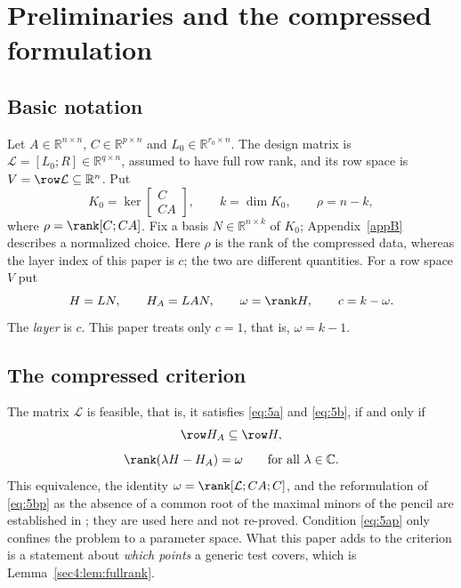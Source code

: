 \section{Preliminaries and the compressed formulation}
\label{sec:prelim}

\subsection{Basic notation}
\label{sec:prelim:notation}

Let $A\in\mathbb R^{n\times n}$, $C\in\mathbb R^{p\times n}$ and $L_0\in\mathbb R^{r_0\times n}$. The
design matrix is $\mathcal L=[L_0;R]\in\mathbb R^{q\times n}$, assumed to have full row rank, and its
row space is $V=\row\mathcal L\subseteq\mathbb R^n$. Put
\begin{equation}
  \label{eq:K0}
  K_0=\ker\left[\begin{smallmatrix}C\\ CA\end{smallmatrix}\right],\qquad
  k=\dim K_0,\qquad
  \rho=n-k,
\end{equation}
where $\rho=\rank[C;CA]$. Fix a basis $N\in\mathbb R^{n\times k}$ of $K_0$; Appendix~\ref{appB}
describes a normalized
choice. Here $\rho$ is the rank of the compressed data, whereas the layer index of this paper is $c$;
the two are different quantities. For a row space $V$ put
\begin{equation}
  \label{eq:compressed-data}
  H=LN,\qquad H_A=LAN,\qquad \omega=\rank H,\qquad c=k-\omega .
\end{equation}
The \emph{layer} is $c$. This paper treats only $c=1$, that is, $\omega=k-1$.

\subsection{The compressed criterion}
\label{sec:prelim:criterion}

The matrix $\mathcal L$ is feasible, that is, it satisfies \eqref{eq:5a} and \eqref{eq:5b}, if and only
if
\begin{equation}
  \label{eq:5ap}
  \row H_A\subseteq\row H,
\end{equation}
\begin{equation}
  \label{eq:5bp}
  \rank(\lambda H-H_A)=\omega\qquad\text{for all }\lambda\in\mathbb C .
\end{equation}
This equivalence, the identity $\omega=\rank[\mathcal L;CA;C]$, and the reformulation of
\eqref{eq:5bp} as the absence of a common root of the maximal minors of the pencil are established in
\cite{companion1}; they are used here and not re-proved. Condition \eqref{eq:5ap} only confines the
problem to a parameter space. What this paper adds to the criterion is a statement about \emph{which
points} a generic test covers, which is Lemma~\ref{sec4:lem:fullrank}.

